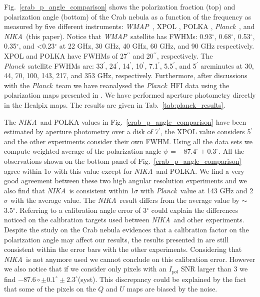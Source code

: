 \documentclass[twocolumn,traditabstract]{aa}
\def\NIKA{\textit{NIKA}}
\def\Planck{\textit{Planck}}
\def\WMAP{\textit{WMAP}}
\begin{document}
Fig.~\ref{crab_p_angle_comparison} shows the polarization fraction (top) and polarization angle (bottom) of the Crab nebula as a function of the frequency as measured by
five different instruments: 
\WMAP\ \citep{2011ApJS..192...19W}, XPOL \citep{aumont2010}, POLKA \citep{2014PASP..126.1027W}, \Planck\ \citep{2015arXiv150702058P}, and \NIKA\ (this paper). 
Notice that \WMAP\ satellite has FWHMs: 0.93$^{\circ}$, 0.68$^{\circ}$, 0.53$^{\circ}$, 0.35$^{\circ}$, and \textless 0.23$^{\circ}$ at 22 GHz, 30 GHz, 40 GHz, 60 GHz, and 90 GHz respectively. XPOL and POLKA have FWHMs of 27$^{\prime\prime}$ and 20$^{\prime\prime}$, respectively.
The \Planck\ satellite FWHMs are: 33$^{\prime}$, 24$^{\prime}$, 14$^{\prime}$, 10$^{\prime}$, 7.1$^{\prime}$, 5.5$^{\prime}$, and 5$^{\prime}$ arcminutes at 30, 44, 70, 100, 143, 217, and 353 GHz, respectively. Furthermore, after discussions with the \Planck\ team we have reanalysed the \Planck\ HFI data using the polarization maps presented in \cite{refId0}. We have performed aperture photometry directly in the Healpix maps. The results are given in Tab.~\ref{tab:planck_results}.

The \NIKA\ and POLKA values in Fig.~\ref{crab_p_angle_comparison} have been estimated by aperture photometry over a disk of 7$^{\prime}$, the XPOL value considers 5$^{\prime}$ and the other experiments consider their own FWHM.
Using all the data sets we compute weighted-average of the polarization angle $\psi$ = $-87.4^{\circ}\pm 0.3^{\circ}$.  
All the observations shown on the bottom panel of
Fig.~\ref{crab_p_angle_comparison} agree within 1$\sigma$ with this value except for \NIKA\ and POLKA.
We find a very good agreement between these two high angular resolution experiments and we also find that \NIKA\ is consistent within 1$\sigma$ with \Planck\ value at 143 GHz and 2$\sigma$ with the average value.
The \NIKA\ result differs from the average value by $\sim$3.5$^{\circ}$. 
Referring to \cite{ritacco2017} a calibration angle error of 3$^{\circ}$ could explain the differences noticed on the calibration targets used between \NIKA\ and other experiments. Despite the study on the Crab nebula evidences that a calibration factor on the polarization angle may affect our results, the results presented in \cite{ritacco2017} are still consistent within the error bars with the other experiments. Considering that \NIKA\ is not anymore used we cannot conclude on this calibration error.
However we also notice that if we consider only pixels with an $I_{pol}$ SNR larger than 3 we find $-87.6{\circ} \pm 0.1^{\circ} \pm 2.3^{\circ}$(syst). This discrepancy could be explained by the fact that some of the pixels on the $Q$ and $U$ maps are biased by the noise.
  
\end{document}
